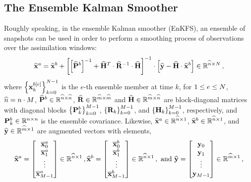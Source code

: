 \subsection{The Ensemble Kalman Smoother}
\label{subsec:EnKFS}
%
Roughly speaking, in the ensemble Kalman smoother (EnKFS), an ensemble of snapshots can be used in order to perform a smoothing process of observations over the assimilation windows:
\begin{eqnarray}
\widehat{{\bf x}}^a = \widehat{{\bf x}}^b  + \left [ \left [ \widehat{{\bf P}}^b \right ]^{-1} + \widehat{{\bf H}}^T \cdot \widehat{{\bf R}}^{-1} \cdot \widehat{{\bf H}} \right ]^{-1} \cdot \left [ \widehat{{\bf y}}-\widehat{{\bf H}} \cdot \widehat{{\bf x}}^b \right ] \in \mathbb{R}^{\widehat{n} \times N} \,,
\end{eqnarray}
%
where $\left \{ {\bf x}^{b[e]}_k \right \}_{k=0}^{N-1}$ is the $e$-th ensemble member at time $k$, for $1 \le e \le N$, $\widehat{n} = n \cdot M$, $\widehat{{\bf P}}^b \in \mathbb{R}^{\widehat{n} \times \widehat{n}}$, $\widehat{{\bf R}} \in \mathbb{R}^{\widehat{m} \times \widehat{m}}$ and $\widehat{{\bf H}} \in \mathbb{R}^{\widehat{m} \times \widehat{n}}$ are block-diagonal matrices with diagonal blocks $\left \{ {\bf P}^b_k \right \}_{k=0}^{M-1}$, $\left \{ {\bf R}_k \right \}_{k=0}^{M-1}$, and $\left \{ {\bf H}_k \right \}_{k=0}^{M-1}$, respectively, and ${\bf P}^b_k \in \mathbb{R}^{n \times n}$ is the ensemble covariance. Likewise, $\widehat{{\bf x}}^a \in \mathbb{R}^{\widehat{n} \times 1}$, $\widehat{{\bf x}}^b \in \mathbb{R}^{\widehat{n} \times 1}$, and $\widehat{{\bf y}} \in \mathbb{R}^{\widehat{m} \times 1}$ are augmented vectors with elements, 
\begin{eqnarray}
\widehat{{\bf x}}^a = \begin{bmatrix}
\overline{\bf x}^a_0 \\
\overline{\bf x}^a_1 \\
\vdots \\
\overline{\bf x}^a_{M-1}
\end{bmatrix} \in \mathbb{R}^{\widehat{n} \times 1} \,,
\widehat{{\bf x}}^b = \begin{bmatrix}
\overline{\bf x}^b_0 \\
\overline{\bf x}^b_1 \\
\vdots \\
\overline{\bf x}^b_{M-1}
\end{bmatrix} \in \mathbb{R}^{\widehat{n} \times 1} \,, \text{ and }
\widehat{{\bf y}} = \begin{bmatrix}
{\bf y}_0 \\
{\bf y}_1 \\
\vdots \\
{\bf y}_{M-1}
\end{bmatrix} \in \mathbb{R}^{\widehat{m} \times 1} \,,
\end{eqnarray}
%
